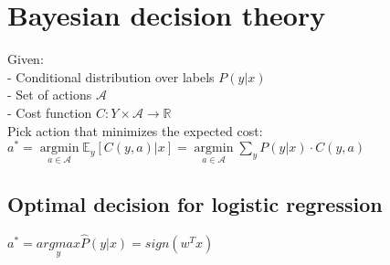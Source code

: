 \section*{Bayesian decision theory}
Given:\\
- Conditional distribution over labels $P(y|x)$\\
- Set of actions $\mathcal{A}$\\
- Cost function $C:Y\times \mathcal{A} \rightarrow \mathbb{R}$\\
Pick action that minimizes the expected cost:
$a^* = \underset{a \in \mathcal{A}}{\operatorname{argmin}} \mathbb{E}_y[C(y,a)|x] = \underset{a \in \mathcal{A}}{\operatorname{argmin}} \sum_y P(y|x) \cdot C(y,a)$ 
\subsection*{Optimal decision for logistic regression}
$a^* = \underset{y}{argmax} \hat{P}(y|x) = sign(w^T x)$


